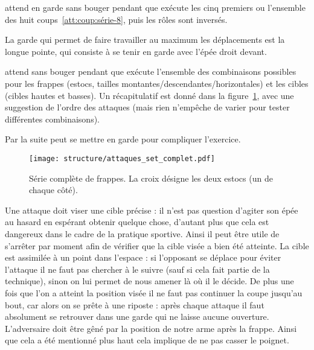 \begin{exercice}


	\D attend en garde sans bouger pendant que \A exécute les cinq premiers ou l'ensemble des huit coups~\ref{att:coup:série-8}, puis les rôles sont inversés.

	La garde qui permet de faire travailler au maximum les déplacements est la longue pointe, qui consiste à se tenir en garde avec l'épée droit devant.
\end{exercice}


\begin{exercice}


	\D attend sans bouger pendant que \A exécute l'ensemble des combinaisons possibles pour les frappes (estocs, tailles montantes/descendantes/horizontales) et les cibles (cibles hautes et basses).
	Un récapitulatif est donné dans la figure~\ref{att:fig:série-complète}, avec une suggestion de l'ordre des attaques (mais rien n'empêche de varier pour tester différentes combinaisons).

	Par la suite \D peut se mettre en garde pour compliquer l'exercice.
\end{exercice}


\begin{figure}[ht]
	\centering
	\texttt{[image: structure/attaques\_set\_complet.pdf]}
	\caption{Série complète de frappes.
	La croix désigne les deux estocs (un de chaque côté).}
	\label{att:fig:série-complète}
\end{figure}


Une attaque doit viser une cible précise : il n'est pas question d'agiter son épée au hasard en espérant obtenir quelque chose, d'autant plus que cela est dangereux dans le cadre de la pratique sportive.
Ainsi il peut être utile de s'arrêter par moment afin de vérifier que la cible visée a bien été atteinte.
La cible est assimilée à un point dans l'espace : si l'opposant se déplace pour éviter l'attaque il ne faut pas chercher à le suivre (sauf si cela fait partie de la technique), sinon on lui permet de nous amener là où il le décide.
De plus une fois que l'on a atteint la position visée il ne faut pas continuer la coupe jusqu'au bout, car alors on se prête à une riposte : après chaque attaque il faut absolument se retrouver dans une garde qui ne laisse aucune ouverture.
L'adversaire doit être gêné par la position de notre arme après la frappe.
Ainsi que cela a été mentionné plus haut cela implique de ne pas casser le poignet.

